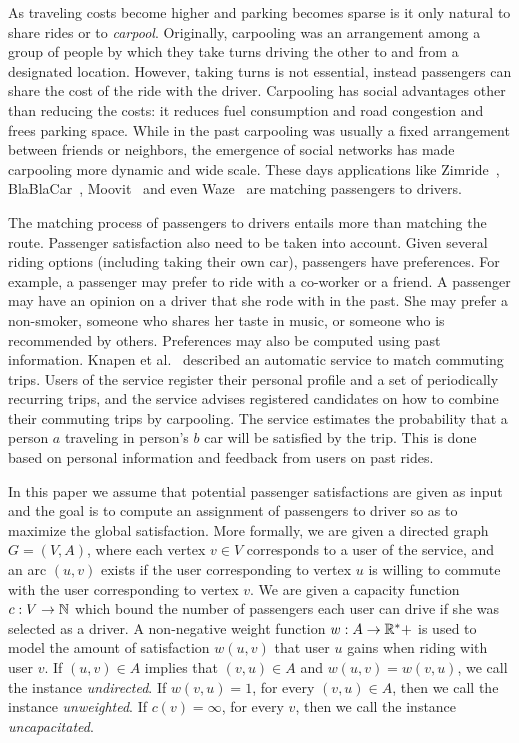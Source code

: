
As traveling costs become higher and parking becomes sparse is it only
natural to share rides or to \emph{carpool}.  Originally, carpooling
was an arrangement among a group of people by which they take turns
driving the other to and from a designated location.  However, taking
turns is not essential, instead passengers can share the cost of the
ride with the driver.  Carpooling has social advantages other than
reducing the costs: it reduces fuel consumption and road congestion
and frees parking space.  
%
While in the past carpooling was usually a fixed arrangement between
friends or neighbors, the emergence of social networks has made
carpooling more dynamic and wide scale.  These days applications like
Zimride~\cite{zimride}, BlaBlaCar~\cite{blablacar},
Moovit~\cite{moovit} and even Waze~\cite{waze} are matching passengers
to drivers.

The matching process of passengers to drivers entails more than
matching the route.  Passenger satisfaction also need to be taken into
account.
%
Given several riding options (including taking their own car),
passengers have preferences.  For example, a passenger may prefer to
ride with a co-worker or a friend.  A passenger may have an opinion on
a driver that she rode with in the past.  She may prefer a non-smoker,
someone who shares her taste in music, or someone who is recommended
by others.
%
Preferences may also be computed using past information.  Knapen et
al.~\cite{knapen2013estimating} described an automatic service to
match commuting trips.  Users of the service register their personal
profile and a set of periodically recurring trips, and the service
advises registered candidates on how to combine their commuting trips
by carpooling.  The service estimates the probability that a person
$a$ traveling in person's $b$ car will be satisfied by the trip.  This
is done based on personal information and feedback from users on past
rides.

In this paper we assume that potential passenger satisfactions are
given as input and the goal is to compute an assignment of passengers
to driver so as to maximize the global satisfaction.
%
More formally, we are given a directed graph $G = (V, A)$, where each
vertex $v \in V$ corresponds to a user of the service, and an arc $(u,
v)$ exists if the user corresponding to vertex $u$ is willing to
commute with the user corresponding to vertex $v$.  We are given a
capacity function $c: V \rightarrow \mathbb{N}$ which bound the number of
passengers each user can drive if she was selected as a driver.  A
non-negative weight function $w : A \rightarrow \mathbb{R}^*+$ is used to model
the amount of satisfaction $w(u,v)$ that user $u$ gains when riding
with user $v$.
%
If $(u,v) \in A$ implies that $(v,u) \in A$ and $w(u,v) = w(v,u)$, we
call the instance \emph{undirected}.  If $w(v,u) = 1$, for every
$(v,u) \in A$, then we call the instance
\emph{unweighted}.  If $c(v) = \infty$, for every $v$, then we
call the instance \emph{uncapacitated}.

